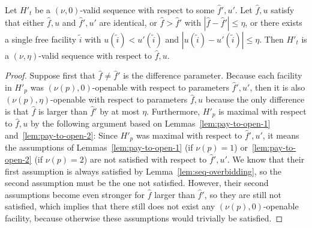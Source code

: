 \begin{claim}
\label{claim:param-ident}
    Let $H'_t$ be a $(\nu, 0)$-valid sequence with respect to some $\hat f', u'$.
    Let $\hat f, u$ satisfy that either $\hat f, u$ and $\hat f', u'$ are identical, or $\hat f > \hat f'$ with $|\hat f - \hat f'| \leq \eta$, or there exists a single free facility $\tilde{i}$ with $u(\tilde i) < u'(\tilde i)$  and $|u(\tilde i) - u'(\tilde i)| \leq \eta$.
    Then $H'_t$ is a $(\nu,\eta)$-valid sequence with respect to $\hat f, u$.
    \label{claim:1ststep_etavalid}
\end{claim}
\begin{proof}
Suppose first that $\hat f\neq \hat f'$ is the difference parameter.
Because each facility in $H'_p$ was $(\nu(p),0)$-openable with respect to parameters $\hat f', u'$, then it is also $(\nu(p),\eta)$-openable with respect to parameters $\hat f, u$ because the only difference is that $\hat f$ is larger than $\hat f'$ by at most $\eta$.
Furthermore, $H'_p$ is maximal with respect to $\hat f, u$ by the following argument based on Lemmas~\ref{lem:pay-to-open-1} and~\ref{lem:pay-to-open-2}: Since $H'_p$ was maximal with respect to $\hat f', u'$, it means the assumptions of Lemmas~\ref{lem:pay-to-open-1} (if $\nu(p)=1$) or~\ref{lem:pay-to-open-2} (if $\nu(p)=2$) are not satisfied with respect to $\hat f', u'$.
We know that their first assumption is always satisfied by Lemma~\ref{lem:seq-overbidding}, so the second assumption must be the one not satisfied.
However, their second assumptions become even stronger for $\hat f$ larger than $\hat f'$, so they are still not satisfied, which implies that there still does not exist any $(\nu(p),0)$-openable facility, because otherwise these assumptions would trivially be satisfied.


\end{proof}
